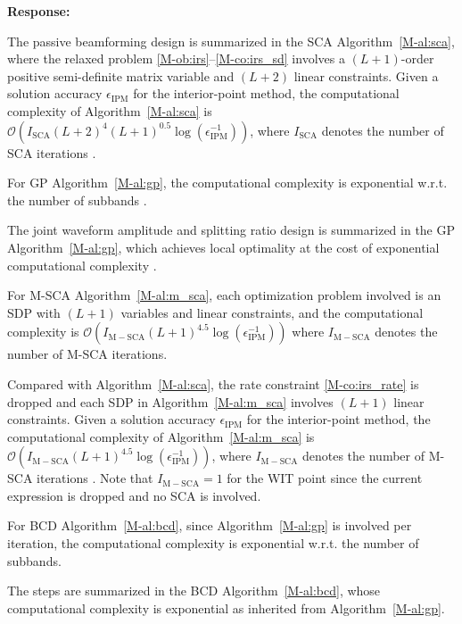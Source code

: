 \documentclass{article}
\newcounter{reviewer}
\newcounter{point}[reviewer]
\newcounter{response}[reviewer]
\newenvironment{response}
	{\refstepcounter{response} \medskip \noindent \textbf{Response:}\ }
	{\medskip}
\begin{document}
\begin{reviewer}
\begin{response}
			\begin{framed}
				The passive beamforming design is summarized in the SCA Algorithm~\ref{M-al:sca}, where the relaxed problem \eqref{M-ob:irs}--\eqref{M-co:irs_sd} involves a $(L+1)$-order positive semi-definite matrix variable and $(L+2)$ linear constraints. Given a solution accuracy $\epsilon_{\mathrm{IPM}}$ for the interior-point method, the computational complexity of Algorithm~\ref{M-al:sca} is $\mathcal{O}\left(I_{\mathrm{SCA}}(L+2)^4 (L+1)^{0.5} \log(\epsilon_{\mathrm{IPM}}^{-1})\right)$, where $I_{\mathrm{SCA}}$ denotes the number of SCA iterations \cite{M-Luo2010}.
			\end{framed}

			For GP Algorithm~\ref{M-al:gp}, the computational complexity is exponential w.r.t. the number of subbands \cite{M-Chiang2005}.
			\begin{framed}
				The joint waveform amplitude and splitting ratio design is summarized in the GP Algorithm~\ref{M-al:gp}, which achieves local optimality at the cost of exponential computational complexity \cite{M-Chiang2005}.
			\end{framed}

			For M-SCA Algorithm~\ref{M-al:m_sca}, each optimization problem involved is an SDP with $(L+1)$ variables and linear constraints, and the computational complexity is $\mathcal{O}\left(I_{\mathrm{M-SCA}}(L+1)^{4.5} \log(\epsilon_{\mathrm{IPM}}^{-1})\right)$ where $I_{\mathrm{M-SCA}}$ denotes the number of M-SCA iterations.
			\begin{framed}
				Compared with Algorithm~\ref{M-al:sca}, the rate constraint \eqref{M-co:irs_rate} is dropped and each SDP in Algorithm~\ref{M-al:m_sca} involves $(L+1)$ linear constraints. Given a solution accuracy $\epsilon_{\mathrm{IPM}}$ for the interior-point method, the computational complexity of Algorithm~\ref{M-al:m_sca} is $\mathcal{O}\left(I_{\mathrm{M-SCA}}(L+1)^{4.5} \log(\epsilon_{\mathrm{IPM}}^{-1})\right)$, where $I_{\mathrm{M-SCA}}$ denotes the number of M-SCA iterations \cite{M-Luo2010}. Note that $I_{\mathrm{M-SCA}}=1$ for the WIT point since the current expression is dropped and no SCA is involved.
			\end{framed}

			For BCD Algorithm~\ref{M-al:bcd}, since Algorithm~\ref{M-al:gp} is involved per iteration, the computational complexity is exponential w.r.t. the number of subbands.
			\begin{framed}
				The steps are summarized in the BCD Algorithm~\ref{M-al:bcd}, whose computational complexity is exponential as inherited from Algorithm~\ref{M-al:gp}.
			\end{framed}


\end{response}
\end{reviewer}
\end{document}
